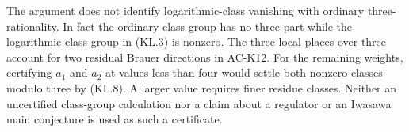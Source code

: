 \begin{remark}
The argument does not identify logarithmic-class vanishing
with ordinary three-rationality.  In fact the ordinary class
group has no three-part while the logarithmic class group in
(KL.3) is nonzero.  The three local places over three account
for two residual Brauer directions in AC-K12.
For the remaining weights, certifying $a_1$ and $a_2$ at values
less than four would settle both nonzero classes modulo three
by (KL.8).  A larger value requires finer residue classes.
Neither an uncertified class-group calculation nor a claim
about a regulator or an Iwasawa main conjecture is used as
such a certificate.
\end{remark}
